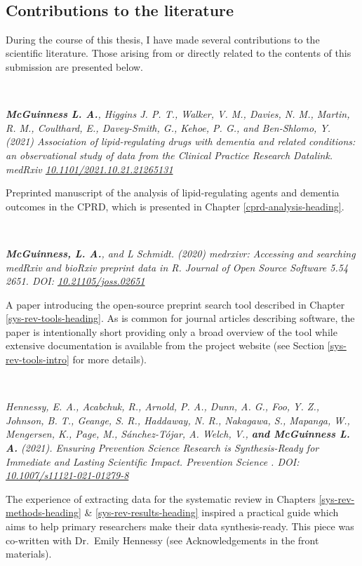 \documentclass[a4paper, twoside]{templates/ociamthesis}
\begin{document}
~

\hypertarget{literature-contributions}{%
\subsection{Contributions to the literature}\label{literature-contributions}}

During the course of this thesis, I have made several contributions to the scientific literature. Those arising from or directly related to the contents of this submission are presented below.

~

\emph{\textbf{McGuinness L. A.}, Higgins J. P. T., Walker, V. M., Davies, N. M., Martin, R. M., Coulthard, E., Davey-Smith, G., Kehoe, P. G., and Ben-Shlomo, Y. (2021) Association of lipid-regulating drugs with dementia and related conditions: an observational study of data from the Clinical Practice Research Datalink. medRxiv \href{https://doi.org/10.1101/2021.10.21.21265131}{10.1101/2021.10.21.21265131}}

Preprinted manuscript of the analysis of lipid-regulating agents and dementia outcomes in the CPRD, which is presented in Chapter \ref{cprd-analysis-heading}.

~

\emph{\textbf{McGuinness, L. A.}, and L Schmidt. (2020) medrxivr: Accessing and searching medRxiv and bioRxiv preprint data in R. Journal of Open Source Software 5.54 2651. DOI: \href{https://doi.org/10.21105/joss.02651}{10.21105/joss.02651}}

A paper introducing the open-source preprint search tool described in Chapter \ref{sys-rev-tools-heading}. As is common for journal articles describing software, the paper is intentionally short providing only a broad overview of the tool while extensive documentation is available from the project website (see Section \ref{sys-rev-tools-intro} for more details).

~

\emph{Hennessy, E. A., Acabchuk, R., Arnold, P. A., Dunn, A. G., Foo, Y. Z., Johnson, B. T., Geange, S. R., Haddaway, N. R., Nakagawa, S., Mapanga, W., Mengersen, K., Page, M., Sánchez-Tójar, A. Welch, V., \textbf{and McGuinness L. A.} (2021). Ensuring Prevention Science Research is Synthesis-Ready for Immediate and Lasting Scientific Impact. Prevention Science . DOI: \href{https://doi.org/10.1007/s11121-021-01279-8}{10.1007/s11121-021-01279-8}}

The experience of extracting data for the systematic review in Chapters \ref{sys-rev-methods-heading} \& \ref{sys-rev-results-heading} inspired a practical guide which aims to help primary researchers make their data synthesis-ready. This piece was co-written with Dr.~Emily Hennessy (see Acknowledgements in the front materials).
\end{document}

